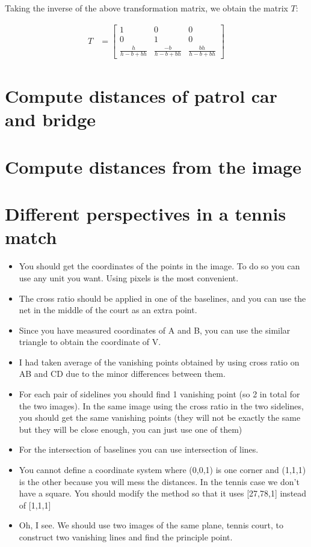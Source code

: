 \documentclass[12pt, oneside]{article}
\begin{document}
Taking the inverse of the above transformation matrix, we obtain the matrix $T$:

\begin{align*}
    T &=
    \begin{bmatrix}
      1             &  0   & 0 \\
      0             &  1   & 0 \\
      \frac{h}{h - b + bh}      &  
      \frac{-b}{h - b + bh}     & 
      \frac{bh}{h - b + bh}
      \end{bmatrix}
\end{align*}

\clearpage
\section{Compute distances of patrol car and bridge}

\clearpage
\section{Compute distances from the image}

\clearpage
\section{Different perspectives in a tennis match}

\begin{itemize}
    \item You should get the coordinates of the points in the image. To do so you can use 
        any unit you want. Using pixels is the most convenient. 
    \item The cross ratio should  be applied in one of the baselines, and you can use 
        the net in the middle of the court as an extra point.
    \item Since you have measured coordinates of A and B, you can use the similar triangle 
        to obtain the coordinate of V.
    \item I had taken average of the vanishing points obtained by using cross ratio on AB 
        and CD due to the minor differences between them.
    \item For each pair of sidelines you should find 1 vanishing point (so 2 in total 
        for the two images). In the same image using the cross ratio in the two sidelines, 
        you  should get the same vanishing points (they will not be exactly the same but 
        they will be close enough, you can just use one of them)
    \item For the intersection of baselines you can use intersection of lines.
    \item You cannot define a coordinate system where (0,0,1) is one corner and (1,1,1) 
        is the other because you will mess the distances. In the tennis case we don't 
        have a square. You should modify the method so that it uses [27,78,1] 
        instead of [1,1,1]
    \item  Oh, I see. We should use two images of the same plane, tennis court, to construct 
        two vanishing lines and find the principle point.
\end{itemize}
\end{document}
